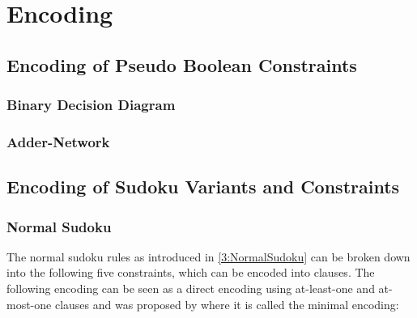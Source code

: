 \chapter{Encoding}


\section{Encoding of Pseudo Boolean Constraints}\label{EncodingOfPseudoBooleanConstraints}
\subsection{Binary Decision Diagram}
\subsection{Adder-Network}

\section{Encoding of Sudoku Variants and Constraints}

\newpage
\subsection{Normal Sudoku}
The normal sudoku rules as introduced in \ref{3:NormalSudoku} can be broken down into the following five constraints, which can be encoded into clauses. The following encoding can be seen as a direct encoding using at-least-one and at-most-one clauses and was proposed by \cite{Lynce2006SudokuAsASATProblem} where it is called the minimal encoding:\\


